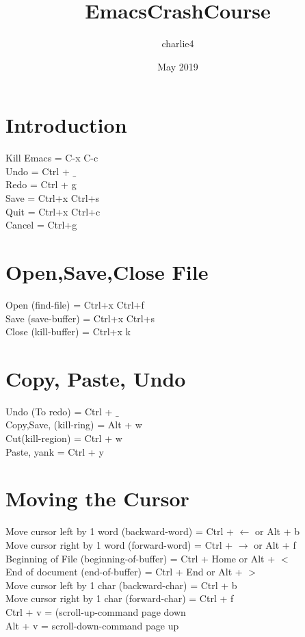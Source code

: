 \documentclass{article}
\title{EmacsCrashCourse}
\author{charlie4 }
\date{May 2019}
\begin{document}
\maketitle

\section{Introduction}
Kill Emacs = C-x C-c
\\
Undo = Ctrl + $\_$
\\
Redo = Ctrl + g
\\
Save = Ctrl+x Ctrl+s
\\
Quit = Ctrl+x Ctrl+c
\\
Cancel = Ctrl+g

\section{Open,Save,Close File}
Open (find-file) = Ctrl+x Ctrl+f
\\
Save (save-buffer) = Ctrl+x Ctrl+s
\\
Close (kill-buffer) = Ctrl+x k

\section{Copy, Paste, Undo}
Undo (To redo) = Ctrl + $\_$
\\
Copy,Save, (kill-ring) = Alt + w
\\
Cut(kill-region) = Ctrl + w
\\
Paste, yank = Ctrl + y

\section{Moving the Cursor}

Move cursor left by 1 word (backward-word) = Ctrl + $\leftarrow$ or Alt + b
\\
Move cursor right by 1 word (forward-word) = Ctrl + $\rightarrow$ or Alt + f
\\
Beginning of File (beginning-of-buffer) = Ctrl + Home or Alt + $<$
\\
End of document (end-of-buffer) = Ctrl + End or Alt + $>$
\\
Move cursor left by 1 char (backward-char) = Ctrl + b
\\
Move cursor right by 1 char (forward-char) = Ctrl + f
\\
Ctrl + v = (scroll-up-command page down
\\
Alt + v = scroll-down-command page up
\\
\end{document}

